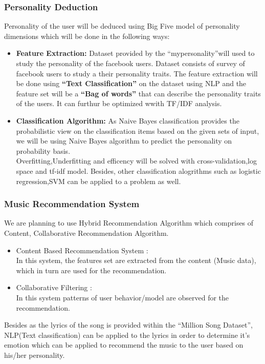 \documentclass[a4paper,12pt]{article}
\begin{document}
\subsubsection{Personality Deduction}
Personality of the user will be deduced using Big Five model of personality dimensions which will be done in the following ways:
\begin{itemize}
\item \textbf{Feature Extraction:} Dataset provided by the ``mypersonality''will used to study the personality of the facebook users. Dataset consists of survey of facebook users to study a their personality traits. The feature extraction will be done using \textbf{``Text Classification''} on the dataset using NLP and the feature set will be a \textbf{``Bag of words''} that can describe the personality traits of the users. It can furthur be optimized wwith TF/IDF analysis.
\item \textbf{Classification Algorithm:} As Naive Bayes classification provides the probabilistic view on the classification items based on the given sets of input, we will be using Naive Bayes algorithm to predict the personality on probability basis.\\
	Overfitting,Underfitting and efficency will be solved with cross-validation,log space and tf-idf model.
	Besides, other classification alogrithms such as logistic regression,SVM can be applied to a problem as well.
\end{itemize}
\subsubsection{Music Recommendation System}
We are planning to use Hybrid Recommendation Algorithm which comprises of Content, Collaborative Recommendation Algorithm.
\begin{itemize}
\item Content Based Recommendation System :\\
  In this system, the features set are extracted from the content (Music data), which in turn are used for the recommendation.
\item Collaborative Filtering :\\
  In this system patterns of user behavior/model are observed for the recommendation.
\end{itemize}
Besides as the lyrics of the song is provided within the ``Million Song Dataset'', NLP(Text classification) can be applied to the lyrics in order to determine it's emotion which can be applied to recommend the music to the user based on his/her personality.
\cleardoublepage
\end{document}
